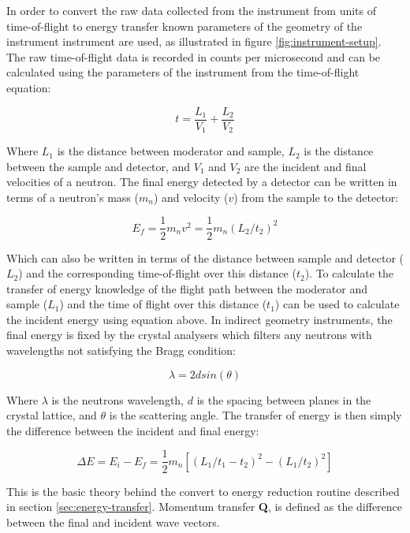 \documentclass[paper=a4, fontsize=11pt]{scrartcl}	%
\numberwithin{equation}{section}															%
\numberwithin{figure}{section}																%
\numberwithin{table}{section}																%
\begin{document}
In order to convert the raw data collected from the instrument from units of time-of-flight to energy transfer known parameters of the geometry of the instrument instrument are used, as illustrated in figure \ref{fig:instrument-setup}. The raw time-of-flight data is recorded in counts per microsecond and can be calculated using the parameters of the instrument from the time-of-flight equation:

\begin{equation}
\label{eq:time-of-flight}
t = \frac{L_1}{V_1} + \frac{L_2}{V_2}
\end{equation}

Where $L_1$ is the distance between moderator and sample, $L_2$ is the distance between the sample and detector, and $V_1$ and $V_2$ are the incident and final velocities of a neutron. The final energy detected by a detector can be written in terms of a neutron's mass ($m_{n}$) and velocity ($v$) from the sample to the detector:

\begin{equation}
E_f = \frac{1}{2}m_{n}v^2 = \frac{1}{2}m_{n} ( L_2 / t_2 ) ^2
\end{equation}

Which can also be written in terms of the distance between sample and detector ($L_2$) and the corresponding time-of-flight over this distance ($t_2$). To calculate the transfer of energy knowledge of the flight path between the moderator and sample ($L_1$) and the time of flight over this distance ($t_1$) can be used to calculate the incident energy using equation above. In indirect geometry instruments, the final energy is fixed by the crystal analysers which filters any neutrons with wavelengths not satisfying the Bragg condition:

\begin{equation}
\label{eq:braggs-law}
\lambda = 2dsin(\theta)
\end{equation}

Where $\lambda$ is the neutrons wavelength, $d$ is the spacing between planes in the crystal lattice, and $\theta$ is the scattering angle. The transfer of energy is then simply the difference between the incident and final energy:

\begin{equation}
\Delta E = E_i - E_f = \frac{1}{2}m_n[(L_1 / t_1-t_2)^2 - (L_1/t_2)^2]
\end{equation}

This is the basic theory behind the convert to energy reduction routine described in section \ref{sec:energy-transfer}. Momentum transfer \textbf{Q}, is defined as the difference between the final and incident wave vectors.
\end{document}
